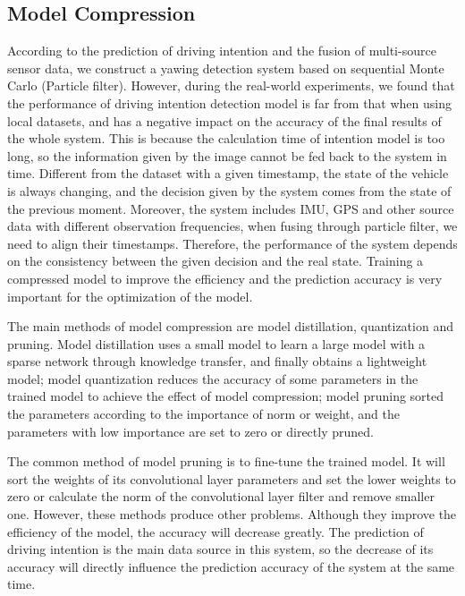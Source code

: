 \documentclass[journal]{IEEEtran}
\begin{document}
\subsection{Model Compression}\label{sec:pruning}
According to the prediction of driving intention and the fusion of multi-source sensor data, we construct a yawing detection system based on sequential Monte Carlo (Particle filter). However, during the real-world experiments, we found that the performance of driving intention detection model is far from that when using local datasets, and has a negative impact on the accuracy of the final results of the whole system. This is because the calculation time of intention model is too long, so the information given by the image cannot be fed back to the system in time. Different from the dataset with a given timestamp, the state of the vehicle is always changing, and the decision given by the system comes from the state of the previous moment. Moreover, the system includes IMU, GPS and other source data with different observation frequencies, when fusing through particle filter, we need to align their timestamps. Therefore, the performance of the system depends on the consistency between the given decision and the real state. Training a compressed model to improve the efficiency and the prediction accuracy is very important for the optimization of the model.

The main methods of model compression are model distillation, quantization and pruning. Model distillation uses a small model to learn a large model with a sparse network through knowledge transfer, and finally obtains a lightweight model; model quantization reduces the accuracy of some parameters in the trained model to achieve the effect of model compression; model pruning sorted the parameters according to the importance of norm or weight, and the parameters with low importance are set to zero or directly pruned.

The common method of model pruning is to fine-tune the trained model. It will sort the weights of its convolutional layer parameters and set the lower weights to zero or calculate the norm of the convolutional layer filter and remove smaller one. However, these methods produce other problems. Although they improve the efficiency of the model, the accuracy will decrease greatly. The prediction of driving intention is the main data source in this system, so the decrease of its accuracy will directly influence the prediction accuracy of the system at the same time.
\end{document}
